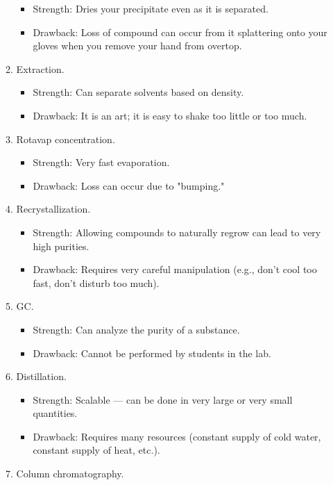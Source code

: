 \documentclass[titlepage]{article}
\begin{document}
\begin{enumerate}
\begin{enumerate}
\begin{itemize}
            \item Strength: Dries your precipitate even as it is separated.
            \item Drawback: Loss of compound can occur from it splattering onto your gloves when you remove your hand from overtop.
        \end{itemize}
        \item Extraction.
        \begin{itemize}
            \item Strength: Can separate solvents based on density.
            \item Drawback: It is an art; it is easy to shake too little or too much.
        \end{itemize}
        \item Rotavap concentration.
        \begin{itemize}
            \item Strength: Very fast evaporation.
            \item Drawback: Loss can occur due to "bumping."
        \end{itemize}
        \item Recrystallization.
        \begin{itemize}
            \item Strength: Allowing compounds to naturally regrow can lead to very high purities.
            \item Drawback: Requires very careful manipulation (e.g., don't cool too fast, don't disturb too much).
        \end{itemize}
        \item GC.
        \begin{itemize}
            \item Strength: Can analyze the purity of a substance.
            \item Drawback: Cannot be performed by students in the lab.
        \end{itemize}
        \item Distillation.
        \begin{itemize}
            \item Strength: Scalable --- can be done in very large or very small quantities.
            \item Drawback: Requires many resources (constant supply of cold water, constant supply of heat, etc.).
        \end{itemize}
        \item Column chromatography.

\end{enumerate}
\end{enumerate}
\end{document}
